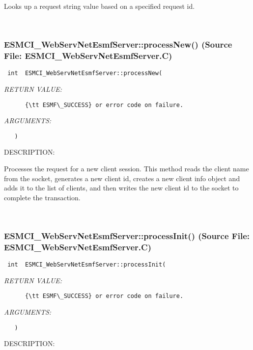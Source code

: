       Looks up a request string value based on a specified request id.
   
 
\mbox{}\hrulefill\
 
\subsubsection{ESMCI\_WebServNetEsmfServer::processNew() (Source File: ESMCI\_WebServNetEsmfServer.C)}


  
\begin{verbatim} int  ESMCI_WebServNetEsmfServer::processNew(\end{verbatim}{\em RETURN VALUE:}
\begin{verbatim}      {\tt ESMF\_SUCCESS} or error code on failure.\end{verbatim}{\em ARGUMENTS:}
\begin{verbatim}   )\end{verbatim}
{\sf DESCRIPTION:\\ }


      Processes the request for a new client session.  This method reads the
      client name from the socket, generates a new client id, creates a new
      client info object and adds it to the list of clients, and then writes
      the new client id to the socket to complete the transaction.
   
 
\mbox{}\hrulefill\
 
\subsubsection{ESMCI\_WebServNetEsmfServer::processInit() (Source File: ESMCI\_WebServNetEsmfServer.C)}


  
\begin{verbatim} int  ESMCI_WebServNetEsmfServer::processInit(\end{verbatim}{\em RETURN VALUE:}
\begin{verbatim}      {\tt ESMF\_SUCCESS} or error code on failure.\end{verbatim}{\em ARGUMENTS:}
\begin{verbatim}   )\end{verbatim}
{\sf DESCRIPTION:\\ }


